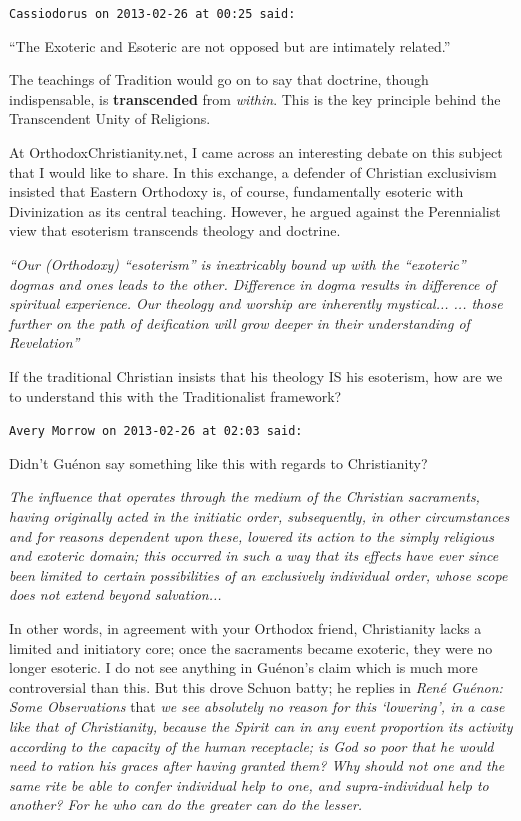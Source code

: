 \begin{footnotesize}
\begin{sffamily}
\texttt{Cassiodorus on 2013-02-26 at 00:25 said:}

``The Exoteric and Esoteric are not opposed but are intimately related.''

The teachings of Tradition would go on to say that doctrine, though indispensable, is \textbf{transcended} from \emph{within}. This is the key principle behind the Transcendent Unity of Religions.

At OrthodoxChristianity.net, I came across an interesting debate on this subject that I would like to share. In this exchange, a defender of Christian exclusivism insisted that Eastern Orthodoxy is, of course, fundamentally esoteric with Divinization as its central teaching. However, he argued against the Perennialist view that esoterism transcends theology and doctrine.

\emph{``Our (Orthodoxy) ``esoterism'' is inextricably bound up with the ``exoteric'' dogmas and ones leads to the other. Difference in dogma results in difference of spiritual experience. Our theology and worship are inherently mystical... ... those further on the path of deification will grow deeper in their understanding of Revelation''}

If the traditional Christian insists that his theology IS his esoterism, how are we to understand this with the Traditionalist framework?

\hfill

\texttt{Avery Morrow on 2013-02-26 at 02:03 said:}

Didn't Guénon say something like this with regards to Christianity?

\emph{The influence that operates through the medium of the Christian sacraments, having originally acted in the initiatic order,  subsequently, in other circumstances and for reasons dependent upon these,  lowered its action to the simply religious and exoteric domain;  this occurred in such a way that its effects have ever since been limited to certain possibilities of an exclusively individual order, whose scope does not extend beyond salvation... }

In other words, in agreement with your Orthodox friend, Christianity lacks a limited and initiatory core; once the sacraments became exoteric, they were no longer esoteric. I do not see anything in Guénon's claim which is much more controversial than this. But this drove Schuon batty; he replies in \emph{René Guénon: Some Observations} that \emph{we see absolutely no reason for this `lowering', in a case like that of Christianity, because the Spirit can in any event proportion its activity according to the capacity of the human receptacle; is God so poor that he would need to ration his graces after having granted them? Why should not one and the same rite be able to confer individual help to one, and supra-individual help to another? For he who can do the greater can do the lesser.}


\end{sffamily}
\end{footnotesize}
